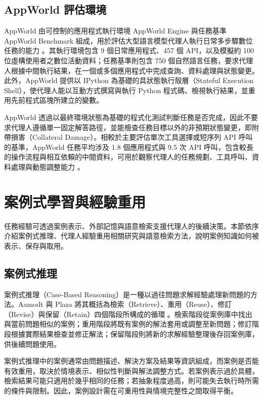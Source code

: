 \subsection{AppWorld 評估環境}

AppWorld 由可控制的應用程式執行環境 AppWorld Engine 與任務基準 AppWorld Benchmark 組成，用於評估大型語言模型代理人執行日常多步驟數位任務的能力 \cite{trivedi2024appworld}。其執行環境包含 9 個日常應用程式、457 個 API，以及模擬約 100 位虛構使用者之數位活動資料；任務基準則包含 750 個自然語言任務，要求代理人根據中間執行結果，在一個或多個應用程式中完成查詢、資料處理與狀態變更。此外，AppWorld 提供以 IPython 為基礎的具狀態執行殼層（Stateful Execution Shell），使代理人能以互動方式撰寫與執行 Python 程式碼、檢視執行結果，並重用先前程式區塊所建立的變數。

AppWorld 透過以最終環境狀態為基礎的程式化測試判斷任務是否完成，因此不要求代理人遵循單一固定解答路徑，並能檢查任務目標以外的非預期狀態變更，即附帶損害（Collateral Damage）。相較於主要評估單次工具選擇或短序列 API 呼叫的基準，AppWorld 任務平均涉及 1.8 個應用程式與 9.5 次 API 呼叫，包含較長的操作流程與相互依賴的中間資料，可用於觀察代理人的任務規劃、工具呼叫、資料處理與動態調整能力 \cite{trivedi2024appworld}。

\section{案例式學習與經驗重用}

任務經驗可透過案例表示、外部記憶與語意檢索支援代理人的後續決策。本節依序介紹案例式推理、代理人經驗重用相關研究與語意檢索方法，說明案例知識如何被表示、保存與取用。

\subsection{案例式推理}

案例式推理（Case-Based Reasoning）是一種以過往問題求解經驗處理新問題的方法。Aamodt 與 Plaza 將其概括為檢索（Retrieve）、重用（Reuse）、修訂（Revise）與保留（Retain）四個階段所構成的循環 \cite{aamodt1994cbr}。檢索階段從案例庫中找出與當前問題相似的案例；重用階段將既有案例的解法套用或調整至新問題；修訂階段根據實際結果檢查並修正解法；保留階段則將新的求解經驗整理後存回案例庫，供後續問題使用。

案例式推理中的案例通常由問題描述、解決方案及結果等資訊組成，而案例是否能有效重用，取決於情境表示、相似性判斷與解法調整方式。若案例表示過於具體，檢索結果可能只適用於幾乎相同的任務；若抽象程度過高，則可能失去執行時所需的條件與限制。因此，案例設計需在可重用性與情境完整性之間取得平衡。

